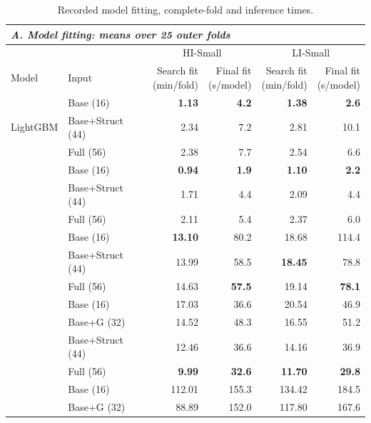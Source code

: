 \begin{table}[p]
\centering
\footnotesize
\caption{Recorded model fitting, complete-fold and inference times.}
\label{tab:timing}
\setlength{\tabcolsep}{4pt}
\begin{threeparttable}
\begin{tabular}{llrrrr}
\toprule
\multicolumn{6}{l}{\textit{A. Model fitting: means over 25 outer folds}} \\
\midrule
& & \multicolumn{2}{c}{HI-Small} & \multicolumn{2}{c}{LI-Small} \\
\cmidrule(lr){3-4}\cmidrule(lr){5-6}
Model & Input & \shortstack{Search fit\\(min/fold)} & \shortstack{Final fit\\(s/model)} & \shortstack{Search fit\\(min/fold)} & \shortstack{Final fit\\(s/model)} \\
\midrule
\multirow{3}{*}{LightGBM\tnote{a}} & Base (16) & \textbf{1.13} & \textbf{4.2} & \textbf{1.38} & \textbf{2.6} \\
 & Base+Struct (44) & 2.34 & 7.2 & 2.81 & 10.1 \\
 & Full (56) & 2.38 & 7.7 & 2.54 & 6.6 \\
\addlinespace[3pt]
\multirow{3}{*}{XGBoost\tnote{a}} & Base (16) & \textbf{0.94} & \textbf{1.9} & \textbf{1.10} & \textbf{2.2} \\
 & Base+Struct (44) & 1.71 & 4.4 & 2.09 & 4.4 \\
 & Full (56) & 2.11 & 5.4 & 2.37 & 6.0 \\
\addlinespace[3pt]
\multirow{3}{*}{Random forest\tnote{a}} & Base (16) & \textbf{13.10} & 80.2 & 18.68 & 114.4 \\
 & Base+Struct (44) & 13.99 & 58.5 & \textbf{18.45} & 78.8 \\
 & Full (56) & 14.63 & \textbf{57.5} & 19.14 & \textbf{78.1} \\
\addlinespace[3pt]
\multirow{4}{*}{MLP\tnote{b}} & Base (16) & 17.03 & 36.6 & 20.54 & 46.9 \\
 & Base+G (32) & 14.52 & 48.3 & 16.55 & 51.2 \\
 & Base+Struct (44) & 12.46 & 36.6 & 14.16 & 36.9 \\
 & Full (56) & \textbf{9.99} & \textbf{32.6} & \textbf{11.70} & \textbf{29.8} \\
\addlinespace[3pt]
\multirow{4}{*}{GraphSAGE\tnote{b}} & Base (16) & 112.01 & 155.3 & 134.42 & 184.5 \\
 & Base+G (32) & 88.89 & 152.0 & 117.80 & 167.6 \\

\end{tabular}
\end{threeparttable}
\end{table}
